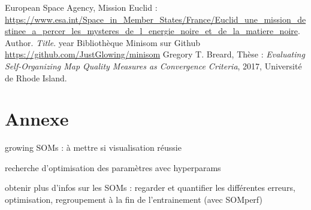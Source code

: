 \documentclass[12pt]{article}
\numberwithin{equation}{section} %
\begin{document}
\newpage
\thispagestyle{empty}



\begin{thebibliography}{1}	%
	 European Space Agency, Mission Euclid : \url{https://www.esa.int/Space_in_Member_States/France/Euclid_une_mission_destinee_a_percer_les_mysteres_de_l_energie_noire_et_de_la_matiere_noire}.
	 Author. \textit{Title}.  year
	 Bibliothèque Minisom sur Github \url{ https://github.com/JustGlowing/minisom}
	 Gregory T. Breard, Thèse : \textit{Evaluating Self-Organizing Map Quality Measures as Convergence Criteria}, 2017, Université de Rhode Island.

\end{thebibliography}





\newpage
\part*{Annexe}


growing SOMs : à mettre si visualisation réussie

recherche d'optimisation des paramètres avec hyperparams


obtenir plus d'infos sur les SOMs : regarder et quantifier les différentes erreurs, optimisation, regroupement à la fin de l'entrainement (avec SOMperf)
\end{document}
